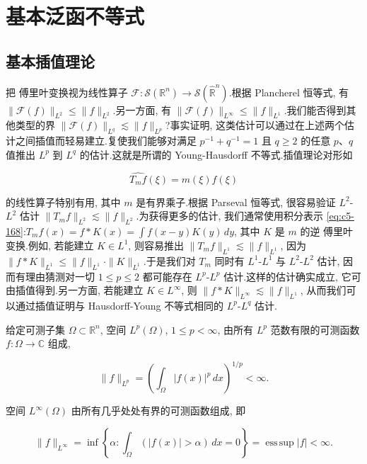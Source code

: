 \chapter{基本泛函不等式}

\section{基本插值理论}


把 傅里叶变换视为线性算子 $\mathcal{F}:\mathcal{S}(\mathbb{R}^n)\to\mathcal{S}(\widehat{\mathbb{R}}^n)$.根据 Plancherel 恒等式, 有 $\|\mathcal{F}(f)\|_{L^2}\le\|f\|_{L^2}$.另一方面, 有 $\|\mathcal{F}(f)\|_{L^\infty}\le\|f\|_{L^1}$.我们能否得到其他类型的界 $\|\mathcal{F}(f)\|_{L^q}\lesssim\|f\|_{L^p}$?事实证明, 这类估计可以通过在上述两个估计之间插值而轻易建立.复使我们能够对满足 $p^{-1}+q^{-1}=1$ 且 $q\ge 2$ 的任意 $p$、$q$ 值推出 $L^p$ 到 $L^q$ 的估计.这就是所谓的 Young-Hausdorff 不等式.插值理论对形如

\[
\widehat{T_m f}(\xi) = m(\xi)\hat{f}(\xi)
\]

的线性算子特别有用, 其中 $m$ 是有界乘子.根据 Parseval 恒等式, 很容易验证 $L^2$-$L^2$ 估计 $\|T_m f\|_{L^2}\lesssim\|f\|_{L^2}$.为获得更多的估计, 我们通常使用积分表示 \eqref{eq:c5-168}:$T_m f(x) = f*K(x) = \int f(x-y)K(y)\, dy$, 其中 $K$ 是 $m$ 的逆 傅里叶变换.例如, 若能建立 $K\in L^1$, 则容易推出 $\|T_m f\|_{L^1}\lesssim\|f\|_{L^1}$, 因为 $\|f*K\|_{L^1}\le\|f\|_{L^1}\cdot\|K\|_{L^1}$.于是我们对 $T_m$ 同时有 $L^1$-$L^1$ 与 $L^2$-$L^2$ 估计, 因而有理由猜测对一切 $1\le p\le 2$ 都可能存在 $L^p$-$L^p$ 估计.这样的估计确实成立, 它可由插值得到.另一方面, 若能建立 $K\in L^\infty$, 则 $\|f*K\|_{L^\infty}\lesssim\|f\|_{L^1}$, 从而我们可以通过插值证明与 Hausdorff-Young 不等式相同的 $L^p$-$L^q$ 估计.


给定可测子集 $\Omega\subset\mathbb{R}^n$, 空间 $L^p(\Omega)$, $1\le p<\infty$, 由所有 $L^p$ 范数有限的可测函数 $f:\Omega\to\mathbb{C}$ 组成,

\[
\|f\|_{L^p} = \left(\int_\Omega |f(x)|^p\, dx\right)^{1/p} < \infty.
\]

空间 $L^\infty(\Omega)$ 由所有几乎处处有界的可测函数组成, 即

\[
\|f\|_{L^\infty} = \inf\left\{\alpha : \int_\Omega (|f(x)| > \alpha)\, dx = 0\right\} = \operatorname{ess\, sup}|f| < \infty.
\]

